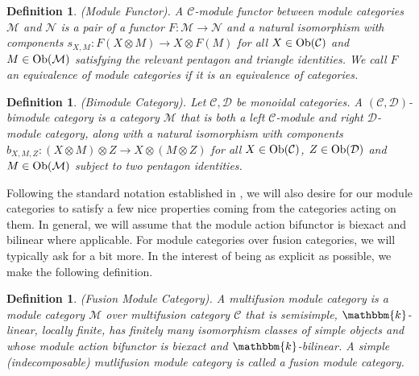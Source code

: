 \documentclass[12pt, reqno]{amsart}
\numberwithin{equation}{section}
\theoremstyle{plainspace}
\theoremstyle{definitionspace}
\newtheorem{definition}[theorem]{Definition}
\theoremstyle{remarkspace}
\newcommand{\mathcat}[1]{\mathcal{#1}}
\newcommand{\Ob}{\textup{Ob}}
\begin{document}
\begin{definition}\label{def:module_functor}{\em (Module Functor).} \cite[Definition 7.2.1]{Etingof_2016}
A {\em $\mathcat{C}$-module functor} between module categories $\mathcat{M}$ and $\mathcat{N}$ is a pair of a functor $F : \mathcat{M} \to \mathcat{N}$ and a natural isomorphism with components $s_{X,M} : F(X \otimes M) \to X \otimes F(M)$ for all $X \in \Ob(\mathcat{C})$ and $M \in \Ob(\mathcat{M})$ satisfying the relevant pentagon and triangle identities. We call $F$ an {\em equivalence of module categories} if it is an equivalence of categories.
\end{definition}
\leavevmode

\begin{definition}\label{def:bimodule_category}{\em (Bimodule Category).} \cite[Definition 7.1.7]{Etingof_2016}
Let $\mathcat{C}, \mathcat{D}$ be monoidal categories. A {\em $(\mathcat{C}, \mathcat{D})$-bimodule category} is a category $\mathcat{M}$ that is both a left $\mathcat{C}$-module and right $\mathcat{D}$-module category, along with a natural isomorphism with components $b_{X,M,Z} : (X \otimes M) \otimes Z \to X \otimes (M \otimes Z)$ for all $X \in \Ob(\mathcat{C})$, $Z \in \Ob(\mathcat{D})$ and $M \in \Ob(\mathcat{M})$ subject to two pentagon identities.
\end{definition}
\leavevmode

\noindent Following the standard notation established in \cite{Ostrik_2003}, we will also desire for our module categories to satisfy a few nice properties coming from the categories acting on them. In general, we will assume that the module action bifunctor is biexact and bilinear where applicable. For module categories over fusion categories, we will typically ask for a bit more. In the interest of being as explicit as possible, we make the following definition.
\newline

\begin{definition}\label{def:fusion_module}{\em (Fusion Module Category).}
A {\em multifusion module category} is a module category $\mathcat{M}$ over multifusion category $\mathcat{C}$ that is semisimple, $\mathbbm{k}$-linear, locally finite, has finitely many isomorphism classes of simple objects and whose module action bifunctor is biexact and $\mathbbm{k}$-bilinear. A simple (indecomposable) mutlifusion module category is called a {\em fusion module category}.
\end{definition}
\leavevmode
\end{document}
